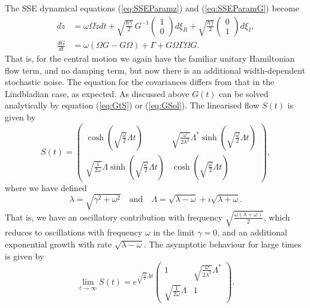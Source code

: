 \documentclass[12pt]{iopart} %
\begin{document}
The SSE dynamical equations (\ref{eq:SSEParamz}) and (\ref{eq:SSEParamG}) become
\begin{equation} \label{eq:SSEPos}
   \begin{aligned}
	d\tilde z &= \omega \Omega \tilde z dt+\sqrt{\frac{\hbar \gamma}{2}}\, G^{-1} \begin{pmatrix}1\\0\end{pmatrix}d\xi_R+\sqrt{\frac{\hbar \gamma}{2}} \begin{pmatrix}0\\ 1\end{pmatrix}d\xi_I,\\
	\frac{d G}{dt}&=\omega(\Omega G-G\Omega)+\Gamma+G \Omega \Gamma\Omega G.
\end{aligned} 
\end{equation} 
That is, for the central motion we again have the familiar unitary Hamiltonian flow term, and no damping term, but now there is an additional width-dependent stochastic noise. The equation for the covariances differs from that in the Lindbladian case, as expected. As discussed above $G(t)$ can be solved analytically by equation (\ref{eq:GtS}) or (\ref{eq:GSol}). The linearised flow $S(t)$ is given by 
\begin{equation}
\label{eqn:ex1S}
    S(t)=\begin{pmatrix}
    \cosh(\sqrt{\frac{\omega}{2}}\Lambda t) &
    \sqrt{\frac{\omega}{2 \lambda^2}}\Lambda^{*}\sinh(\sqrt{\frac{\omega}{2}}\Lambda t) \\
    \sqrt{\frac{1}{2 \omega}}\Lambda \sinh(\sqrt{\frac{\omega}{2}}\Lambda t)
    & \cosh(\sqrt{\frac{\omega}{2}}\Lambda t)
    \end{pmatrix},
\end{equation}
where we have defined 
\begin{equation} 
\lambda=\sqrt{\gamma^2+\omega^2}\quad\text{and}\quad\Lambda=\sqrt{\lambda-\omega}+i\sqrt{\lambda+\omega}.
\end{equation}
That is, we have an oscillatory contribution with frequency $\sqrt{\frac{\omega(\lambda+\omega)}{2}}$, which reduces to oscillations with frequency $\omega$ in the limit $\gamma=0$, and an additional exponential growth with rate $\sqrt{\lambda-\omega}$. The asymptotic behaviour for large times is given by 
\begin{equation}
    \lim_{t\to\infty}S(t)=e^{\sqrt{\frac{\omega}{2}}\Lambda t}\begin{pmatrix}
    1 &
    \sqrt{\frac{\omega}{2 \lambda^2}}\Lambda^{*} \\
    \sqrt{\frac{1}{2 \omega}}\Lambda 
    & 1
    \end{pmatrix}.
\end{equation}
\end{document}

